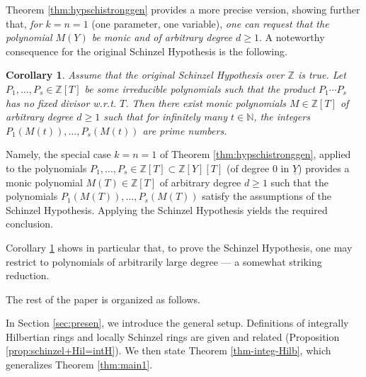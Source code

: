 \documentclass[11pt,a4paper,reqno]{amsart}
\def\Z{\mathbb{Z}}
\newtheorem{cor}[thm]{Corollary}
\theoremstyle{definition}
\begin{document}
\vskip 2mm

Theorem \ref{thm:hypschistronggen} provides a more precise version, showing further that, \emph{for $k=n=1$} (one parameter, one variable), \emph{one can request that the polynomial $M(Y)$ be monic and of arbitrary degree $d\geq 1$}. A noteworthy consequence for the original Schinzel Hypothesis is the following.

\begin{cor} \label{cor:SH} Assume that the original Schinzel Hypothesis over $\Z$ is true. 
Let $P_1,\ldots,P_s \in \Z[T]$ be some irreducible polynomials such that the product $P_1\cdots P_s$ has no fixed divisor \hbox{w.r.t.} $T$. Then there exist monic polynomials $M\in \mathbb{Z}[T]$ of arbitrary degree
$d\geq 1$ such that for infinitely many $t \in {\mathbb N}$, the integers $P_1(M(t)),\ldots,P_s(M(t))$ are prime numbers.
\end{cor}

Namely, the special case $k=n=1$ of Theorem \ref{thm:hypschistronggen}, applied to the polynomials $P_1,\ldots,P_s \in \Z[T]\subset \Z[Y][T]$ (of degree $0$ in $\underline Y$) provides a monic polynomial $M(T)\in {\mathbb Z}[T]$ of arbitrary degree $d\geq 1$ such that
the polynomials $P_1(M(T)),\ldots,P_s(M(T))$ satisfy the assumptions of the Schinzel Hypothesis. Applying the Schinzel Hypothesis yields the required conclusion.
\vskip 1mm

Corollary \ref{cor:SH} shows in particular that, to prove the Schinzel Hypothesis, one may restrict to  polynomials of arbitrarily large degree — a somewhat striking reduction.
\vskip 2mm






 



The rest of the paper is organized as follows.
\vskip 1mm

In Section \ref{sec:presen}, we introduce the general setup. Definitions  of integrally Hilbertian rings and locally Schinzel rings are given and related (Proposition \ref{prop:schinzel+Hil=intH}).
We then state Theorem \ref{thm-integ-Hilb}, which generalizes Theorem \ref{thm:main1}.
\vskip 1mm
\end{document}
